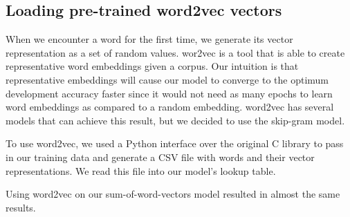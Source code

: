 \documentclass{article} %
\begin{document}
\subsection{Loading pre-trained word2vec vectors}

When we encounter a word for the first time, we generate its vector representation as a set of random values. wor2vec is a tool that is able to create representative word embeddings given a corpus. Our intuition is that representative embeddings will cause our model to converge to the optimum development accuracy faster since it would not need as many epochs to learn word embeddings as compared to a random embedding. word2vec has several models that can achieve this result, but we decided to use the skip-gram model.

To use word2vec, we used a Python interface over the original C library to pass in our training data and generate a CSV file with words and their vector representations. We read this file into our model's lookup table.

Using word2vec on our sum-of-word-vectors model resulted in almost the same results. 

{}

\end{document}
